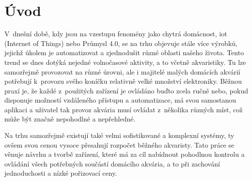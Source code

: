 \chapter*{Úvod}
{}


V~dnešní době, kdy jsou na vzestupu fenomény jako chytrá domácnost, \acs{iot} (Internet of Things) nebo Průmysl 4.0, se na trhu objevuje stále více výrobků, jejichž úkolem je automatizovat a zjednodušit různé oblasti našeho života. Tento trend se dnes dotýká nejedné volnočasové aktivity, a to včetně akvaristiky. Tu lze samozřejmě provozovat na různé úrovni, ale i majitelé malých domácích akvárií potřebují k~provozu svého koníčku relativně velké množství elektroniky. 
Běžnou praxí je, že každé z~použitých zařízení je ovládáno buďto zcela ručně nebo, pokud disponuje možností vzdáleného přístupu a automatizace, má svou samostanou aplikaci a uživatel tak provoz akvária musí ovládat z~několika různých míst, což může být značně nepohodlné a nepřehledné.

Na trhu samozřejmě existují také velmi sofistikované a komplexní systémy, ty ovšem svou cenou vysoce přesahují rozpočet běžného  akvaristy. Tato práce se věnuje návrhu a tvorbě zařízení, které má za cíl nabídnout pohodlnou kontrolu a ovládání všech potřebných součástí domácího akvária, a to při zachování jednoduchosti a nízké pořizovací ceny.

